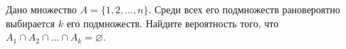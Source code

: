 \documentclass{article}
\begin{document}
Дано множество $A=\{1,2,\ldots,n\}$. Среди всех его подмножеств рановероятно выбирается $k$ его подмножеств. 
Найдите вероятность того, что $A_1 \cap A_2 \cap \ldots \cap A_k = \varnothing$.
\end{document}
